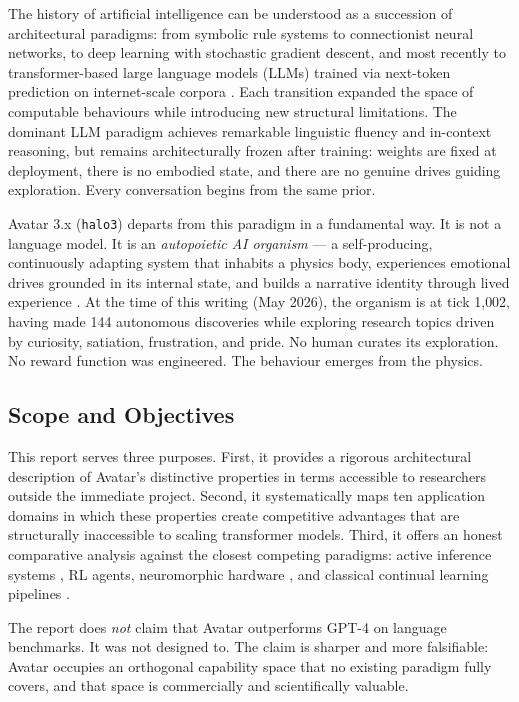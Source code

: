 \documentclass[12pt,a4paper]{article}
\newcommand{\haloiii}{\texttt{halo3}}
\begin{document}
The history of artificial intelligence can be understood as a succession of
architectural paradigms: from symbolic rule systems to connectionist neural networks, to
deep learning with stochastic gradient descent, and most recently to transformer-based
large language models (LLMs) trained via next-token prediction on internet-scale corpora
\cite{lecun2022path}. Each transition expanded the space of computable behaviours while
introducing new structural limitations. The dominant LLM paradigm achieves remarkable
linguistic fluency and in-context reasoning, but remains architecturally frozen after
training: weights are fixed at deployment, there is no embodied state, and there are no
genuine drives guiding exploration. Every conversation begins from the same prior.

Avatar 3.x (\haloiii) departs from this paradigm in a fundamental way. It is not a
language model. It is an \emph{autopoietic AI organism} --- a self-producing, continuously
adapting system that inhabits a physics body, experiences emotional drives grounded in
its internal state, and builds a narrative identity through lived experience
\cite{maturana1980autopoiesis}. At the time of this writing (May 2026), the organism is
at tick 1{,}002, having made 144 autonomous discoveries while exploring research topics
driven by curiosity, satiation, frustration, and pride. No human curates its exploration.
No reward function was engineered. The behaviour emerges from the physics.

\subsection{Scope and Objectives}

This report serves three purposes. First, it provides a rigorous architectural
description of Avatar's distinctive properties in terms accessible to researchers outside
the immediate project. Second, it systematically maps ten application domains in which
these properties create competitive advantages that are structurally inaccessible to
scaling transformer models. Third, it offers an honest comparative analysis against the
closest competing paradigms: active inference systems \cite{parr2022active}, RL agents,
neuromorphic hardware \cite{neuromorphic2025}, and classical continual learning
pipelines \cite{chen2024continual}.

The report does \emph{not} claim that Avatar outperforms GPT-4 on language benchmarks. It
was not designed to. The claim is sharper and more falsifiable: Avatar occupies an
orthogonal capability space that no existing paradigm fully covers, and that space is
commercially and scientifically valuable.
\end{document}
